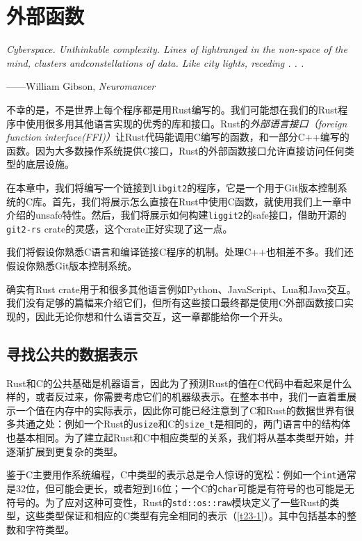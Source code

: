 \chapter{外部函数}\label{ch23}
\emph{Cyberspace. Unthinkable complexity. Lines of lightranged in the non-space of the mind, clusters andconstellations of data. Like city lights, receding . . .}

\begin{flushright}
    ——William Gibson, \emph{Neuromancer}
\end{flushright}

不幸的是，不是世界上每个程序都是用Rust编写的。我们可能想在我们的Rust程序中使用很多用其他语言实现的优秀的库和接口。Rust的\emph{外部语言接口（foreign function interface(FFI)）}让Rust代码能调用C编写的函数，和一部分C++编写的函数。因为大多数操作系统提供C接口，Rust的外部函数接口允许直接访问任何类型的底层设施。

在本章中，我们将编写一个链接到\texttt{libgit2}的程序，它是一个用于Git版本控制系统的C库。首先，我们将展示怎么直接在Rust中使用C函数，就使用我们上一章中介绍的unsafe特性。然后，我们将展示如何构建\texttt{liggit2}的safe接口，借助开源的\texttt{git2-rs} crate的灵感，这个crate正好实现了这一点。

我们将假设你熟悉C语言和编译链接C程序的机制。处理C++也相差不多。我们还假设你熟悉Git版本控制系统。

确实有Rust crate用于和很多其他语言例如Python、JavaScript、Lua和Java交互。我们没有足够的篇幅来介绍它们，但所有这些接口最终都是使用C外部函数接口实现的，因此无论你想和什么语言交互，这一章都能给你一个开头。

\section{寻找公共的数据表示}\label{repr}
Rust和C的公共基础是机器语言，因此为了预测Rust的值在C代码中看起来是什么样的，或者反过来，你需要考虑它们的机器级表示。在整本书中，我们一直着重展示一个值在内存中的实际表示，因此你可能已经注意到了C和Rust的数据世界有很多共通之处：例如一个Rust的\texttt{usize}和C的\texttt{size\_t}是相同的，两门语言中的结构体也基本相同。为了建立起Rust和C中相应类型的关系，我们将从基本类型开始，并逐渐扩展到更复杂的类型。

鉴于C主要用作系统编程，C中类型的表示总是令人惊讶的宽松：例如一个\texttt{int}通常是32位，但可能会更长，或者短到16位；一个C的\texttt{char}可能是有符号的也可能是无符号的。为了应对这种可变性，Rust的\texttt{std::os::raw}模块定义了一些Rust的类型，这些类型保证和相应的C类型有完全相同的表示（\autoref{t23-1}）。其中包括基本的整数和字符类型。

